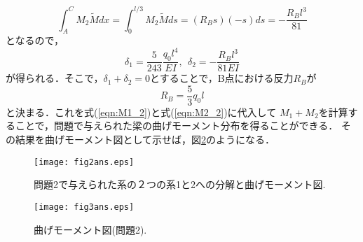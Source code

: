 \documentclass[10pt,a4j]{jarticle}
\begin{document}
\begin{equation}
	\int_A^CM_2\tilde Mdx=
	\int_0^{l/3}M_2\tilde Mds=
	\left(R_Bs \right)
	\left(-s \right)
	ds
	=-\frac{R_Bl^3}{81}
\end{equation}
となるので，
\begin{equation}
	\delta_1=\frac{5}{243}\frac{q_0l^4}{EI}, \ \ 
	\delta_2=-\frac{R_Bl^3}{81EI}
\end{equation}
が得られる．そこで，$\delta_1+\delta_2=0$とすることで，B点における反力$R_B$が
\begin{equation}
	R_B=\frac{5}{3}q_0l
\end{equation}
と決まる．これを式(\ref{eqn:M1_2})と式(\ref{eqn:M2_2})に代入して
$M_1+M_2$を計算することで，問題で与えられた梁の曲げモーメント分布を得ることができる．
その結果を曲げモーメント図として示せば，図\ref{fig:fig3}のようになる．
\begin{figure}
	\vspace{10mm}
	\begin{center}
	\texttt{[image: fig2ans.eps]} 
	\end{center}
	\caption{問題2で与えられた系の２つの系1と2への分解と曲げモーメント図. } 
	\label{fig:fig2}
\end{figure}
\begin{figure}
	\vspace{10mm}
	\begin{center}
	\texttt{[image: fig3ans.eps]} 
	\end{center}
	\caption{曲げモーメント図(問題2). } 
	\label{fig:fig3}
\end{figure}
\end{document}
